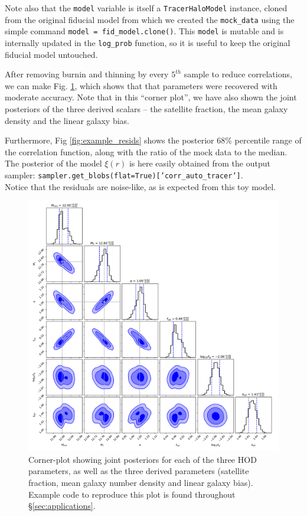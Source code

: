 \documentclass[5p,aas_macros]{elsarticle}
\begin{document}
Note also that the \verb|model| variable is itself a \texttt{Tracer\-Halo\-Model} instance, cloned from the original fiducial model from which we created the \verb|mock_data| using the simple command \texttt{model = fid\_model.clone()}. 
This \verb|model| is mutable and is internally updated in the \verb|log_prob| function, so it is useful to keep the original fiducial model untouched.

After removing burnin and thinning by every $5^{th}$ sample to reduce correlations, we can make Fig. \ref{fig:example1_corner}, which shows that that parameters were recovered with moderate accuracy. 
Note that in this ``corner plot'', we have also shown the joint posteriors of the three derived scalars -- the satellite fraction, the mean galaxy density and the linear galaxy bias.  

Furthermore, Fig \ref{fig:example_resids} shows the posterior 68\%  percentile range of the correlation function, along with the ratio of the mock data to the median. The posterior of the model $\xi(r)$ is here easily obtained from the output sampler: \texttt{sampler.get\_blobs(flat=True)['corr\_auto\_tracer']}. \\
Notice that the residuals are noise-like, as is expected from this toy model.

\begin{figure}
    \centering
    \includegraphics[width=\textwidth]{default_corner.pdf}
    \caption{Corner-plot showing joint posteriors for each of the three HOD parameters, as well as the three derived parameters (satellite fraction, mean galaxy number density and linear galaxy bias). Example code to reproduce this plot is found throughout \S\ref{sec:applications}. }
    \label{fig:example1_corner}
\end{figure}
\end{document}
